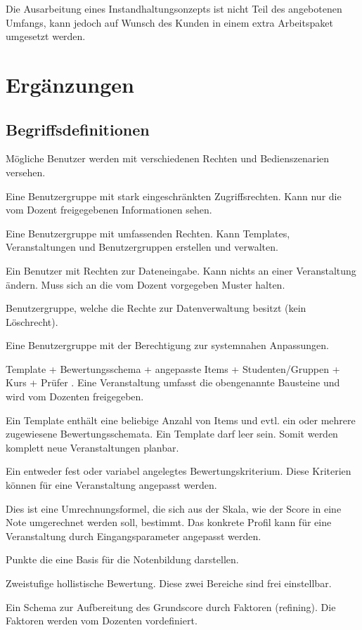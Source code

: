 	Die Ausarbeitung eines Instandhaltungsonzepts ist nicht Teil des angebotenen Umfangs, kann jedoch auf Wunsch des Kunden in einem extra Arbeitspaket umgesetzt werden.
	
	\section{Ergänzungen}
		
	
	
 \begin{appendix}
  \section{Begriffsdefinitionen}
	\begin{description}
	\item[Benutzergruppen] Mögliche Benutzer werden mit verschiedenen Rechten und Bedienszenarien versehen.
	\item[Student] Eine Benutzergruppe mit stark eingeschränkten Zugriffsrechten. Kann nur die vom Dozent freigegebenen Informationen sehen.
	\item[Dozent] Eine Benutzergruppe mit umfassenden Rechten. Kann Templates, Veranstaltungen und Benutzergruppen erstellen und verwalten.
	\item[Prüfer] Ein Benutzer mit Rechten zur Dateneingabe. Kann nichts an einer Veranstaltung ändern. Muss sich an die vom Dozent vorgegeben Muster halten.
	\item[Sekretariat] Benutzergruppe, welche die Rechte zur Datenverwaltung besitzt (kein Löschrecht).
	\item[Administrator] Eine Benutzergruppe mit der Berechtigung zur systemnahen Anpassungen.
	\item[Veranstaltung] Template + Bewertungsschema + angepasste Items + Studenten/Gruppen + Kurs + Prüfer . Eine Veranstaltung umfasst die obengenannte Bausteine und wird vom Dozenten freigegeben. 
	\item[Template] Ein Template enthält eine beliebige Anzahl von Items und evtl. ein oder mehrere zugewiesene Bewertungsschemata. Ein Template darf leer sein. Somit werden komplett neue Veranstaltungen planbar.
	\item[Item] Ein entweder fest oder variabel angelegtes Bewertungskriterium. Diese Kriterien können für eine Veranstaltung angepasst werden.
	\item[{\parbox[t]{0.2\linewidth}{Notenkonvertierungsprofil \\ (S$_2$G)}}] {\parbox[t]{\linewidth}{ Dies ist eine Umrechnungsformel, die sich aus der Skala, wie der Score in eine Note umgerechnet werden soll, bestimmt. Das konkrete Profil kann für eine Veranstaltung durch Eingangsparameter angepasst werden.}}
	\item[Score] Punkte die eine Basis für die Notenbildung darstellen.
	\item[Grundscore (H$_2$)]  Zweistufige hollistische Bewertung. Diese zwei Bereiche sind frei einstellbar.
	\item[Score Refining (S$_2$R)]  Ein Schema zur Aufbereitung des Grundscore durch Faktoren (refining). Die Faktoren werden vom Dozenten vordefiniert.
	

\end{description}
\end{appendix}
